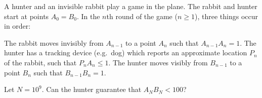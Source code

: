 A hunter and an invisible rabbit play a game in the plane.
The rabbit and hunter start at points $A_0 = B_0$.
In the $n$th round of the game ($n \ge 1$), three things occur in order:
\begin{enumerate}[(i)]
  \ii The rabbit moves invisibly from $A_{n-1}$ to a point $A_n$
  such that $A_{n-1} A_n = 1$.
  \ii The hunter has a tracking device (e.g.\ dog)
  which reports an approximate location $P_n$ of the rabbit,
  such that $P_n A_n \le 1$.
  \ii The hunter moves visibly from $B_{n-1}$ to a point $B_n$
  such that $B_{n-1} B_n = 1$.
\end{enumerate}
Let $N = 10^9$. Can the hunter guarantee that $A_N B_N < 100$?